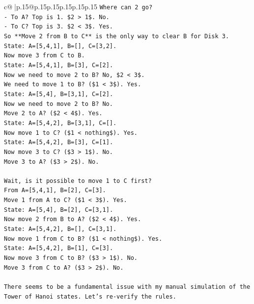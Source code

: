 \documentclass{article}
\begin{document}
{\begin{supertabular}{c@{$\;$}|p{.15\linewidth}@{}p{.15\linewidth}p{.15\linewidth}p{.15\linewidth}p{.15\linewidth}p{.15\linewidth}}
{{{\texttt{Where can 2 go?} \\
\texttt{{-} To A? Top is 1. \$2 > 1\$. No.} \\
\texttt{{-} To C? Top is 3. \$2 < 3\$. Yes.} \\
\texttt{So **Move 2 from B to C** is the only way to clear B for Disk 3.} \\
\texttt{State: A={[}5,4,1{]}, B={[}{]}, C={[}3,2{]}.} \\
\texttt{Now move 3 from C to B.} \\
\texttt{State: A={[}5,4,1{]}, B={[}3{]}, C={[}2{]}.} \\
\texttt{Now we need to move 2 to B? No, \$2 < 3\$.} \\
\texttt{We need to move 1 to B? (\$1 < 3\$). Yes.} \\
\texttt{State: A={[}5,4{]}, B={[}3,1{]}, C={[}2{]}.} \\
\texttt{Now we need to move 2 to B? No.} \\
\texttt{Move 2 to A? (\$2 < 4\$). Yes.} \\
\texttt{State: A={[}5,4,2{]}, B={[}3,1{]}, C={[}{]}.} \\
\texttt{Now move 1 to C? (\$1 < nothing\$). Yes.} \\
\texttt{State: A={[}5,4,2{]}, B={[}3{]}, C={[}1{]}.} \\
\texttt{Now move 3 to C? (\$3 > 1\$). No.} \\
\texttt{Move 3 to A? (\$3 > 2\$). No.} \\
\\ 
\texttt{Wait, is it possible to move 1 to C first?} \\
\texttt{From A={[}5,4,1{]}, B={[}2{]}, C={[}3{]}.} \\
\texttt{Move 1 from A to C? (\$1 < 3\$). Yes.} \\
\texttt{State: A={[}5,4{]}, B={[}2{]}, C={[}3,1{]}.} \\
\texttt{Now move 2 from B to A? (\$2 < 4\$). Yes.} \\
\texttt{State: A={[}5,4,2{]}, B={[}{]}, C={[}3,1{]}.} \\
\texttt{Now move 1 from C to B? (\$1 < nothing\$). Yes.} \\
\texttt{State: A={[}5,4,2{]}, B={[}1{]}, C={[}3{]}.} \\
\texttt{Now move 3 from C to B? (\$3 > 1\$). No.} \\
\texttt{Move 3 from C to A? (\$3 > 2\$). No.} \\
\\ 
\texttt{There seems to be a fundamental issue with my manual simulation of the Tower of Hanoi states. Let's re{-}verify the rules.} \\
}}}
\end{supertabular}}
\end{document}
